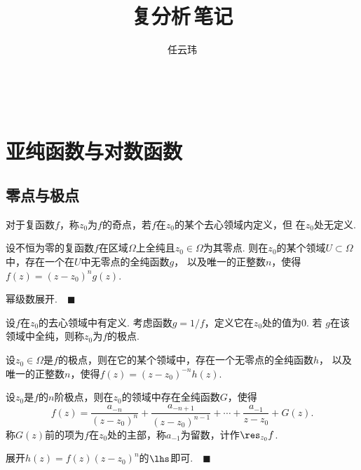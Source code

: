 

\title{复分析$\,$笔记}
\author{任云玮}
\date{}



\maketitle
\tableofcontents

\newpage

 
\newpage


\newpage
\section{亚纯函数与对数函数}

\subsection{零点与极点}

  \begin{defi}[奇点]
    对于复函数$f$，称$z_0$为$f$的奇点，若$f$在$z_0$的某个去心领域内定义，但
    在$z_0$处无定义.
  \end{defi}

  \begin{thm}
    \label{thm: 零点、分离}
    设不恒为零的复函数$f$在区域$\Omega$上全纯且$z_0\in\Omega$为其零点.
    则在$z_0$的某个领域$U\subset\Omega$中，存在一个在$U$中无零点的全纯函数$g$，
    以及唯一的正整数$n$，使得$f(z)=(z-z_0)^ng(z)$.
  \end{thm}
  \proof
    幂级数展开.$\quad\blacksquare$

  \begin{defi}[极点]
    设$f$在$z_0$的去心领域中有定义. 考虑函数$g=1/f$，定义它在$z_0$处的值为$0$. 若
    $g$在该领域中全纯，则称$z_0$为$f$的极点.
  \end{defi}

  \begin{thm}
    设$z_0\in\Omega$是$f$的极点，则在它的某个领域中，存在一个无零点的全纯函数$h$，
    以及唯一的正整数$n$，使得$f(z)=(z-z_0)^{-n}h(z)$.
  \end{thm}

  \begin{thm}
    \label{thm: 极点展开}
    设$z_0$是$f$的$n$阶极点，则在$z_0$的领域中存在全纯函数$G$，使得
    \[
      f(z) = \frac{a_{-n}}{(z-z_0)^n} + \frac{a_{-n+1}}{(z-z_0)^{n-1}} + \cdots +
      \frac{a_{-1}}{z-z_0} + G(z).
    \]
    称$G(z)$前的项为$f$在$z_0$处的主部，称$a_{-1}$为留数，计作$\res_{z_0}f$.
  \end{thm}
  \proof
    展开$h(z)=f(z)(z-z_0)^n$的$\lhs$即可.$\quad\blacksquare$

